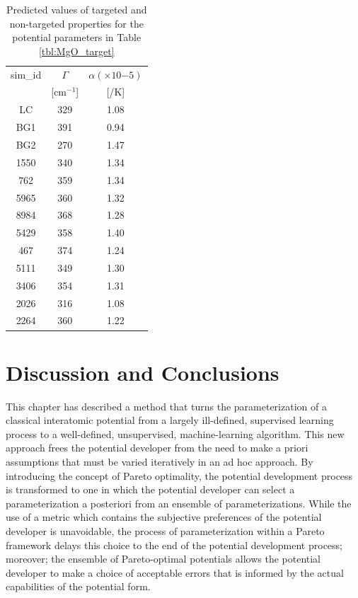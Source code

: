 \begin{table}
	\caption{Predicted values of targeted and non-targeted properties for the potential parameters in Table \ref{tbl:MgO_target}}
	\label{tbl:MgO_best_testing_qoi}	\centering
		\begin{tabular}{ccc}
			\hline
		  sim\_id &$\Gamma$ & $\alpha(\times 10{-5})$ \\
			        & [$\text{cm}^{-1}$] & [/K] \\
		  \hline
			LC   & 329  & 1.08 \\
			BG1  & 391	& 0.94 \\
			BG2  & 270  & 1.47 \\
			1550 & 340	& 1.34 \\
			762  & 359  & 1.34 \\
			5965 & 360  & 1.32 \\
			8984 & 368  & 1.28 \\
			5429 & 358	& 1.40 \\
			467  & 374	& 1.24 \\
			5111 & 349  & 1.30 \\
			3406 & 354	& 1.31 \\
			2026 & 316  & 1.08 \\
			2264 & 360  & 1.22 \\
			\hline
		\end{tabular}
\end{table}

\section{Discussion and Conclusions}
This chapter has described a method that turns the parameterization of a classical interatomic potential from a largely ill-defined, supervised learning process to a well-defined, unsupervised, machine-learning algorithm.  This new approach frees the potential developer from the need to make a priori assumptions that must be varied iteratively in an ad hoc approach.  By introducing the concept of Pareto optimality, the potential development process is transformed to one in which the potential developer can select a parameterization a posteriori from an ensemble of parameterizations. While the use of a metric which contains the subjective preferences of the potential developer is unavoidable, the process of parameterization within a Pareto framework delays this choice to the end of the potential development process; moreover; the ensemble of Pareto-optimal potentials allows the potential developer to make a choice of acceptable errors that is informed by the actual capabilities of the potential form.

